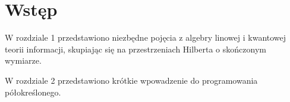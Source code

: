 \section*{Wstęp}

W rozdziale 1 przedstawiono niezbędne pojęcia z algebry linowej i kwantowej teorii informacji, skupiając się na przestrzeniach Hilberta o skończonym wymiarze.

W rozdziale 2 przedstawiono krótkie wpowadzenie do programowania półokreślonego.
